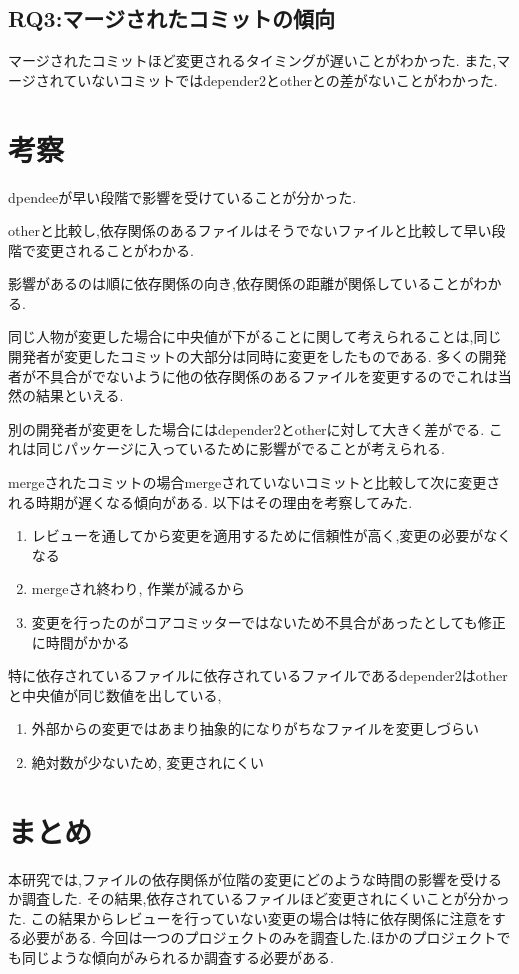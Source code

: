 \documentclass{jsarticle}
\begin{document}
\subsection{RQ3:マージされたコミットの傾向}
マージされたコミットほど変更されるタイミングが遅いことがわかった.
また,マージされていないコミットではdepender2とotherとの差がないことがわかった.



\section{考察}
dpendeeが早い段階で影響を受けていることが分かった.

otherと比較し,依存関係のあるファイルはそうでないファイルと比較して早い段階で変更されることがわかる.

影響があるのは順に依存関係の向き,依存関係の距離が関係していることがわかる.


同じ人物が変更した場合に中央値が下がることに関して考えられることは,同じ開発者が変更したコミットの大部分は同時に変更をしたものである.
多くの開発者が不具合がでないように他の依存関係のあるファイルを変更するのでこれは当然の結果といえる.

別の開発者が変更をした場合にはdepender2とotherに対して大きく差がでる.
これは同じパッケージに入っているために影響がでることが考えられる.



mergeされたコミットの場合mergeされていないコミットと比較して次に変更される時期が遅くなる傾向がある.
以下はその理由を考察してみた.
\begin{enumerate}
\item レビューを通してから変更を適用するために信頼性が高く,変更の必要がなくなる
\item mergeされ終わり, 作業が減るから
\item 変更を行ったのがコアコミッターではないため不具合があったとしても修正に時間がかかる
\end{enumerate}

特に依存されているファイルに依存されているファイルであるdepender2はotherと中央値が同じ数値を出している,
\begin{enumerate}
\item 外部からの変更ではあまり抽象的になりがちなファイルを変更しづらい
\item 絶対数が少ないため, 変更されにくい
\end{enumerate}



\section{まとめ} 
本研究では,ファイルの依存関係が位階の変更にどのような時間の影響を受けるか調査した.
その結果,依存されているファイルほど変更されにくいことが分かった.
この結果からレビューを行っていない変更の場合は特に依存関係に注意をする必要がある.
今回は一つのプロジェクトのみを調査した.ほかのプロジェクトでも同じような傾向がみられるか調査する必要がある.
\end{document}
